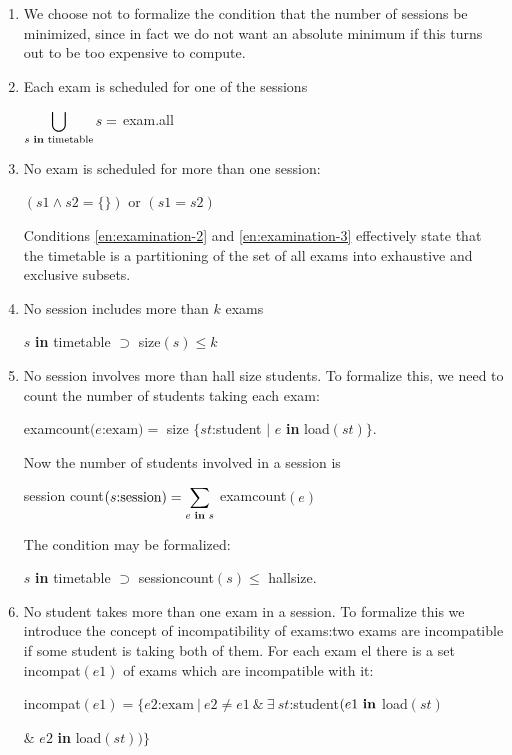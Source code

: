 \begin{enumerate}[wide, nosep, label=(\arabic*)]
	\item \label{en:examination-1}
	We choose not to formalize the condition that the number of sessions be minimized, since in fact we do not want an absolute minimum if this turns out to be too expensive to compute.

	\item \label{en:examination-2}
	Each exam is scheduled for one of the sessions

	$\displaystyle\bigcup_{s\text{ \textbf{in} timetable}} s =$ exam.all
	\smallskip

	\item \label{en:examination-3}
	No exam is scheduled for more than one session:

	\quad $(s1 \wedge s2 = \{\})$ or $(s1 = s2)$

	\noindent
	Conditions \ref{en:examination-2} and \ref{en:examination-3} effectively state that the timetable is a partitioning of the set of all exams into exhaustive and exclusive subsets.

	\item \label{en:examination-4}
	No session includes more than $k$ exams

	\quad $s$ \textbf{in} timetable $\supset$ size$(s) \leqslant k$

	\item \label{en:examination-5}
	No session involves more than hall size students. To formalize this, we need to count the number of students taking each exam:
	
	\quad examcount$(e$:$\text{exam}) = $ size $\{st$:student $\mid$ $e$ \textbf{in} load$(st)\}$.
	
	Now the number of students involved in a session is
	
	\quad session count$(s\text{:session}) = \displaystyle\sum_{e \text{ \textbf{in} } s}$ examcount$(e)$
	
	The condition may be formalized:
	
	\quad $s$ \textbf{in} timetable $\supset$ sessioncount$(s) \leqslant$ hallsize.
	
	\item \label{en:examination-6}
	No student takes more than one exam in a session. To formalize this we introduce the concept of incompatibility of exams:two exams are incompatible if some student is taking both of them. For each exam el there is a set incompat$(e1)$ of exams which are incompatible with it:
	
	\quad incompat$(e1)= \{e2\text{:exam}\ |\ e2 \neq e1\ \&\ \exists\ st$:student$(e1 \text{ \textbf{in}}$ load$(st)$
		
	\tabto*{8.2em} \& $e2$ \textbf{in} load$(st))\}$
\end{enumerate}

